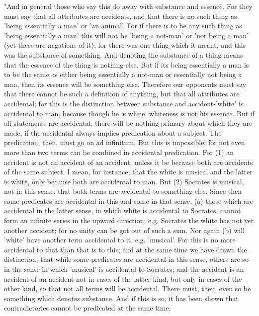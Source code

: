 "And in general those who say this do away with substance and essence.
For they must say that all attributes are accidents, and that there
is no such thing as 'being essentially a man' or 'an animal'. For
if there is to be any such thing as 'being essentially a man' this
will not be 'being a not-man' or 'not being a man' (yet these are
negations of it); for there was one thing which it meant, and this
was the substance of something. And denoting the substance of a thing
means that the essence of the thing is nothing else. But if its being
essentially a man is to be the same as either being essentially a
not-man or essentially not being a man, then its essence will be something
else. Therefore our opponents must say that there cannot be such a
definition of anything, but that all attributes are accidental; for
this is the distinction between substance and accident-'white' is
accidental to man, because though he is white, whiteness is not his
essence. But if all statements are accidental, there will be nothing
primary about which they are made, if the accidental always implies
predication about a subject. The predication, then, must go on ad
infinitum. But this is impossible; for not even more than two terms
can be combined in accidental predication. For (1) an accident is
not an accident of an accident, unless it be because both are accidents
of the same subject. I mean, for instance, that the white is musical
and the latter is white, only because both are accidental to man.
But (2) Socrates is musical, not in this sense, that both terms are
accidental to something else. Since then some predicates are accidental
in this and some in that sense, (a) those which are accidental in
the latter sense, in which white is accidental to Socrates, cannot
form an infinite series in the upward direction; e.g. Socrates the
white has not yet another accident; for no unity can be got out of
such a sum. Nor again (b) will 'white' have another term accidental
to it, e.g. 'musical'. For this is no more accidental to that than
that is to this; and at the same time we have drawn the distinction,
that while some predicates are accidental in this sense, others are
so in the sense in which 'musical' is accidental to Socrates; and
the accident is an accident of an accident not in cases of the latter
kind, but only in cases of the other kind, so that not all terms will
be accidental. There must, then, even so be something which denotes
substance. And if this is so, it has been shown that contradictories
cannot be predicated at the same time. 

